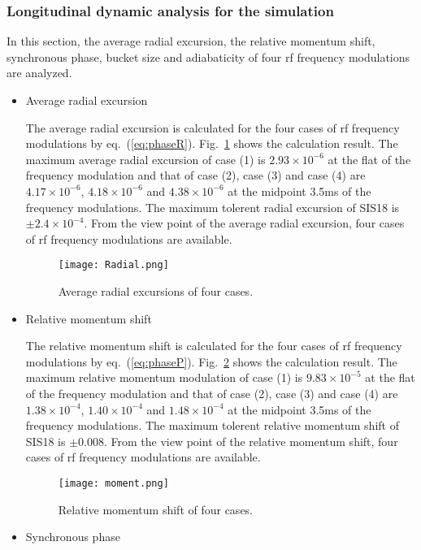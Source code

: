 \subsubsection{Longitudinal dynamic analysis for the simulation}
In this section, the average radial excursion, the relative momentum shift, synchronous phase, bucket size and adiabaticity of four rf frequency modulations are analyzed. 
\begin{itemize}
\item Average radial excursion

The average radial excursion is calculated for the four cases of rf frequency modulations by eq.~(\ref{eq:phaseR}). Fig.~\ref{radial} shows the calculation result. The maximum average radial excursion of case (1) is $2.93\times10^{-6}$ at the flat of the frequency modulation and that of case (2), case (3) and case (4) are $ 4.17\times10^{-6}$, $4.18\times 10^{-6}$ and $4.38\times 10^{-6}$ at the midpoint 3.5ms of the frequency modulations. The maximum tolerent radial excursion of SIS18 is $\pm 2.4\times10^{-4}$. From the view point of the average radial excursion, four cases of rf frequency modulations are available.
\begin{figure}[!htb]
   \centering   
   \texttt{[image: Radial.png]}
   \caption{Average radial excursions of four cases.}
   \label{radial}
\end{figure}

\item Relative momentum shift

The relative momentum shift is calculated for the four cases of rf frequency modulations by eq.~(\ref{eq:phaseP}). Fig.~\ref{moment} shows the calculation result. The maximum relative momentum modulation of case (1) is $9.83\times 10^{-5}$ at the flat of the frequency modulation and that of case (2), case (3) and case (4) are $1.38 \times10^{-4}$, $1.40\times 10^{-4}$ and $1.48\times 10^{-4}$ at the midpoint 3.5ms of the frequency modulations. The maximum tolerent relative momentum shift of SIS18 is $\pm 0.008$. From the view point of the relative momentum shift, four cases of rf frequency modulations are available.
\begin{figure}[!htb]
   \centering   
   \texttt{[image: moment.png]}
   \caption{Relative momentum shift of four cases.}
   \label{moment}
\end{figure}
\item Synchronous phase


\end{itemize}
